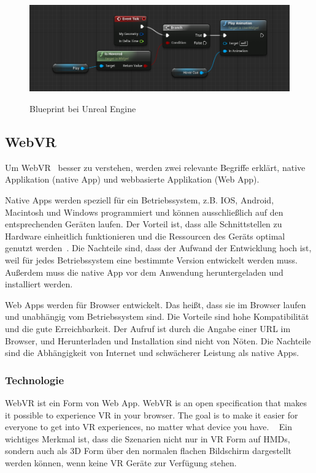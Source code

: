 \begin{figure}[ht]
\vspace*{1em}
\centering
\caption{Blueprint bei Unreal Engine}
\includegraphics[width=\textwidth]{images/ueblueprint.png}
\label{fig:ueblueprint} 
\end{figure}
  
 \subsection{WebVR}
 Um \glqq WebVR \grqq\ besser zu verstehen, werden zwei relevante Begriffe erklärt, native Applikation (native App) und webbasierte Applikation (Web App).
 
 Native Apps werden speziell für ein Betriebssystem, z.B. IOS, Android, Macintosh und Windows programmiert und können ausschließlich auf den entsprechenden Geräten laufen. Der Vorteil ist, \glqq dass alle Schnittstellen zu Hardware einheitlich funktionieren und die Ressourcen des Geräts optimal genutzt werden\grqq\ \citep{22}. Die Nachteile sind, dass der Aufwand der Entwicklung hoch ist, weil für jedes Betriebssystem eine bestimmte Version entwickelt werden muss. Außerdem muss die native App vor dem Anwendung heruntergeladen und installiert werden.
 
 Web Apps werden für Browser entwickelt. Das heißt, dass sie im Browser laufen und unabhängig vom Betriebssystem sind. Die Vorteile sind hohe Kompatibilität und die gute Erreichbarkeit. Der Aufruf ist durch die Angabe einer URL im Browser, und Herunterladen und Installation sind nicht von Nöten. Die Nachteile sind die Abhängigkeit von Internet und schwächerer Leistung als native Apps.
 
  \subsubsection{Technologie}
 WebVR ist ein Form von Web App. \glqq WebVR is an open specification that makes it possible to experience VR in your browser. The goal is to make it easier for everyone to get into VR experiences, no matter what device you have. \grqq\ \citep{21} Ein wichtiges Merkmal ist, dass die Szenarien nicht nur in VR Form auf HMDs, sondern auch als 3D Form über den normalen flachen Bildschirm dargestellt werden können, wenn keine VR Geräte zur Verfügung stehen.
 
